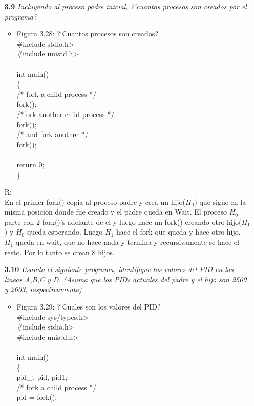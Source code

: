 \begin{itemize}
\item[\textbf{3.9}]\emph{ Incluyendo al proceso padre inicial, ?`cuantos procesos son creados por el programa?} \\
\begin{itemize}
	\item Figura 3.28: ?`Cuantos procesos son creados?\\
\#include \<stdio.h>\\
\#include \<unistd.h>\\
\\
int main()\\
\{\\
	/* fork a child process */\\
	fork();\\
	/*fork another child process */\\
	fork();\\
	/* and fork another */\\
	fork();\\
	\\
	return 0;\\
\}
\end{itemize}
R:\\
En el primer fork() copia al proceso padre y crea un hijo($H_{0}$) que sigue en la misma posicion donde fue creado y el padre queda en Wait. El proceso $H_{0}$ parte con 2 fork()'s adelante de el y luego hace un fork() creando otro hijo($H_{1}$) y $H_{0}$ queda esperando. Luego $H_{1}$ hace el fork que queda y hace otro hijo, $H_{1}$ queda en wait, que no hace nada y termina y recursivamente se hace el resto. Por lo tanto se crean 8 hijos.
\item[\textbf{3.10}]\emph{ Usando el siguiente programa, identifique los valores del PID en las lineas A,B,C y D. (Asuma que los PIDs actuales del padre y el hijo son 2600 y 2603, respectivamente)  }
\begin{itemize}
	\item Figura 3.29: ?`Cuales son los valores del PID?\\
\#include \<sys/types.h>\\
\#include \<stdio.h>\\
\#include \<unistd.h>\\
\\
int main()\\
\{\\
pid\_t pid, pid1;\\
	/* fork a child process */\\
	pid = fork();\\

\end{itemize}
\end{itemize}
